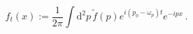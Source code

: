 \begin{equation}
  f_t (x) := \frac{1}{2\pi}\int\!\mathrm{d}^2p\,\tilde{f}(p)
  e^{i(p_0- \omega_p) t}e^{-ipx}\label{f_t}\,.
\end{equation}

